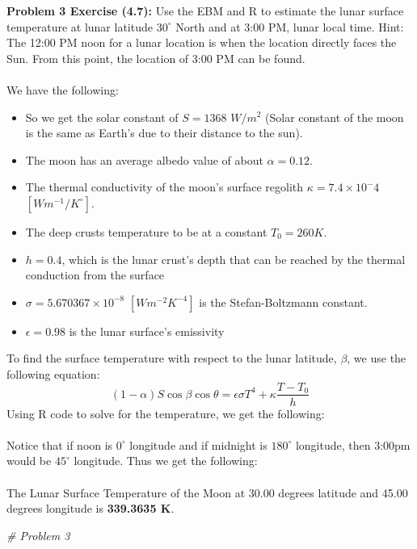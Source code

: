 \documentclass[11pt]{article}
\newenvironment{problem}[1]{\textbf{Problem #1: }}{\newpage}
\newenvironment{Shaded}{\begin{snugshade}}{\end{snugshade}}
\newcommand{\CommentTok}[1]{\textcolor[rgb]{0.56,0.35,0.01}{\textit{#1}}}
\begin{document}
	
	\begin{problem}{3 Exercise (4.7)}
		Use the EBM and R to estimate the lunar surface temperature at lunar latitude $30^{\circ}$
		North and at 3:00 PM, lunar local time. Hint: The 12:00 PM noon for a lunar location is
		when the location directly faces the Sun. From this point, the location of 3:00 PM can be
		found.
		\\ \\
		We have the following: 
		\begin{itemize}[label = -]
			\item So we get the solar constant of $S = 1368$ $W/m^2$ (Solar constant of the moon is the same as Earth's due to their distance to the sun).
			\item The moon has an average albedo value of about $\alpha = 0.12$.
			\item The thermal conductivity of the moon’s surface regolith $\kappa = 7.4 \times 10^-4$ $[Wm^{-1} / K^\circ ]$.
			\item The deep crusts temperature to be at a constant $T_0 = 260 K$.
			\item $h = 0.4$,  which is the lunar crust’s depth that can be reached by the thermal conduction from the surface
			\item $\sigma = 5.670367 \times 10^{-8} $ $[Wm^{-2}K^{-4}]$ is the Stefan-Boltzmann constant. 
			\item $\epsilon = 0.98$ is the lunar surface’s emissivity
		\end{itemize}
		To find the surface temperature with respect to the lunar latitude, $\beta$, we use the following equation:
		\[(1 - \alpha)S\cos\beta\cos\theta = \epsilon\sigma T^{4} + \kappa \frac{T - T_0}{h}\]
		Using R code to solve for the temperature, we get the following:
		\\ \\
		Notice that if noon is $0^\circ$ longitude and if midnight is $180^\circ$ longitude, then 3:00pm would be $45^\circ$ longitude. Thus we get the following:
		\\ \\
		The Lunar Surface Temperature of the Moon at 30.00 degrees latitude and 45.00 degrees longitude is \textbf{339.3635 K}.
		\newpage
\begin{Shaded}
\begin{Highlighting}[]
\CommentTok{# Problem 3}


\end{Highlighting}
\end{Shaded}
\end{problem}
\end{document}
